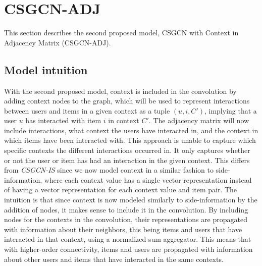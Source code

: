 



\section{CSGCN-ADJ}\label{sec:csgcn_adj}
This section describes the second proposed model, CSGCN with Context in Adjacency Matrix (CSGCN-ADJ).

\subsection{Model intuition}\label{subsec:csgcn_adj_intuition}
With the second proposed model, context is included in the convolution by adding context nodes to the graph, which will be used to represent interactions between users and items in a given context as a tuple $(u,i,C')$, implying that a user $u$ has interacted with item $i$ in context $C'$.
The adjacency matrix will now include interactions, what context the users have interacted in, and the context in which items have been interacted with.
This approach is unable to capture which specific contexts the different interactions occurred in.
It only captures whether or not the user or item has had an interaction in the given context.
This differs from \textit{CSGCN-IS} since we now model context in a similar fashion to side-information, where each context value has a single vector representation instead of having a vector representation for each context value and item pair.
The intuition is that since context is now modeled similarly to side-information by the addition of nodes, it makes sense to include it in the convolution.
By including nodes for the contexts in the convolution, their representations are propagated with information about their neighbors, this being items and users that have interacted in that context, using a normalized sum aggregator.
This means that with higher-order connectivity, items and users are propagated with information about other users and items that have interacted in the same contexts.

